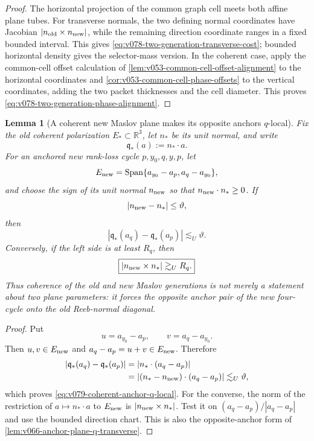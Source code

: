 \documentclass[10pt]{article}
\newtheorem{lemma}[theorem]{Lemma}
\newcommand{\Span}{\operatorname{Span}}
\begin{document}
\begin{proof}
The horizontal projection of the common graph cell meets both affine plane tubes.  For transverse
normals, the two defining normal coordinates have Jacobian
\(|n_{\rm old}\times n_{\rm new}|\), while the remaining direction coordinate ranges in a fixed
bounded interval.  This gives \eqref{eq:v078-two-generation-transverse-cost}; bounded horizontal
density gives the selector-mass version.  In the coherent case, apply the common-cell offset
calculation of \cref{lem:v053-common-cell-offset-alignment} to the horizontal coordinates and
\cref{cor:v053-common-cell-phase-offsets} to the vertical coordinates, adding the two packet
thicknesses and the cell diameter.  This proves
\eqref{eq:v078-two-generation-phase-alignment}.
\end{proof}

\begin{lemma}[A coherent new Maslov plane makes its opposite anchors \(q\)-local]
\label{lem:v079-coherent-new-plane-q-local}
Fix the old coherent polarization \(E_*\subset\mathbb R^3\), let \(n_*\) be its unit normal, and
write
\[
\mathfrak q_*(a):=n_*\cdot a.
\]
For an anchored new rank-loss cycle \(p,y_0,q,y,p\), let
\[
E_{\rm new}
=
\Span\{a_{y_0}-a_p,a_q-a_{y_0}\},
\]
and choose the sign of its unit normal \(n_{\rm new}\) so that
\(n_{\rm new}\cdot n_*\ge0\).  If
\[
|n_{\rm new}-n_*|\le\vartheta,
\]
then
\begin{equation}
\label{eq:v079-coherent-anchor-q-local}
\boxed{
|\mathfrak q_*(a_q)-\mathfrak q_*(a_p)|
\lesssim_U
\vartheta.
}
\end{equation}
Conversely, if the left side is at least \(R_q\), then
\begin{equation}
\label{eq:v079-q-separated-anchor-transverse}
\boxed{
|n_{\rm new}\times n_*|
\gtrsim_U
R_q.
}
\end{equation}
Thus coherence of the old and new Maslov generations is not merely a statement about two plane
parameters: it forces the \emph{opposite anchor pair} of the new four-cycle onto the old
Reeb-normal diagonal.
\end{lemma}

\begin{proof}
Put
\[
u=a_{y_0}-a_p,
\qquad
v=a_q-a_{y_0}.
\]
Then \(u,v\in E_{\rm new}\) and \(a_q-a_p=u+v\in E_{\rm new}\).  Therefore
\[
\begin{aligned}
|\mathfrak q_*(a_q)-\mathfrak q_*(a_p)|
&=
|n_*\cdot(a_q-a_p)|\\
&=
|(n_*-n_{\rm new})\cdot(a_q-a_p)|
\lesssim_U
\vartheta,
\end{aligned}
\]
which proves \eqref{eq:v079-coherent-anchor-q-local}.  For the converse, the norm of the
restriction of \(a\mapsto n_*\cdot a\) to \(E_{\rm new}\) is
\(|n_{\rm new}\times n_*|\).  Test it on
\((a_q-a_p)/|a_q-a_p|\) and use the bounded direction chart.  This is also the opposite-anchor
form of \cref{lem:v066-anchor-plane-q-transverse}.
\end{proof}
\end{document}
